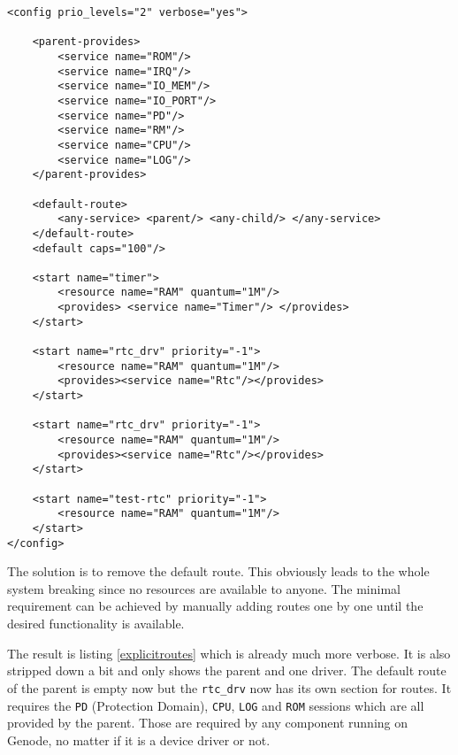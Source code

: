 \documentclass[
a4paper,
12pt,
notitlepage,
parskip=half,
DIV=11,
]{scrbook}
\begin{document}
		\begin{lstlisting}[basicstyle=\ttfamily\footnotesize]
<config prio_levels="2" verbose="yes">

    <parent-provides>
        <service name="ROM"/>
        <service name="IRQ"/>
        <service name="IO_MEM"/>
        <service name="IO_PORT"/>
        <service name="PD"/>
        <service name="RM"/>
        <service name="CPU"/>
        <service name="LOG"/>
    </parent-provides>

    <default-route>
        <any-service> <parent/> <any-child/> </any-service>
    </default-route>
    <default caps="100"/>

    <start name="timer">
        <resource name="RAM" quantum="1M"/>
        <provides> <service name="Timer"/> </provides>
    </start>

    <start name="rtc_drv" priority="-1">
        <resource name="RAM" quantum="1M"/>
        <provides><service name="Rtc"/></provides>
    </start>

    <start name="rtc_drv" priority="-1">
        <resource name="RAM" quantum="1M"/>
        <provides><service name="Rtc"/></provides>
    </start>

    <start name="test-rtc" priority="-1">
        <resource name="RAM" quantum="1M"/>
    </start>
</config>
		\end{lstlisting}
		
		The solution is to remove the default route.
		This obviously leads to the whole system breaking since no resources are available to anyone.
		The minimal requirement can be achieved by manually adding routes one by one until the desired functionality is available.
		
		The result is listing \ref{explicitroutes} which is already much more verbose.
		It is also stripped down a bit and only shows the parent and one driver.
		The default route of the parent is empty now but the \texttt{rtc\_drv} now has its own section for routes.
		It requires the \texttt{PD} (Protection Domain), \texttt{CPU}, \texttt{LOG} and \texttt{ROM} sessions which are all provided by the parent.
		Those are required by any component running on Genode, no matter if it is a device driver or not.
		
\end{document}
